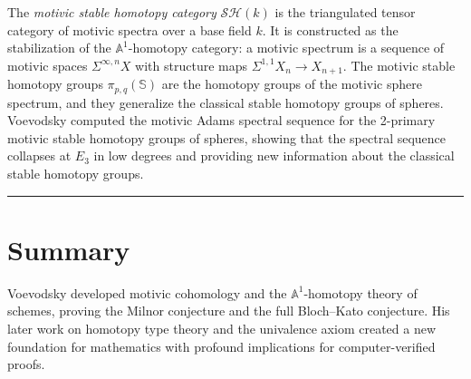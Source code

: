 The \emph{motivic stable homotopy category} $\mathcal{SH}(k)$ is the triangulated tensor category of motivic spectra over a base field $k$. It is constructed as the stabilization of the $\mathbb{A}^1$-homotopy category: a motivic spectrum is a sequence of motivic spaces $\Sigma^{\infty,n} X$ with structure maps $\Sigma^{1,1} X_n \to X_{n+1}$. The motivic stable homotopy groups $\pi_{p,q}(\mathbb{S})$ are the homotopy groups of the motivic sphere spectrum, and they generalize the classical stable homotopy groups of spheres. Voevodsky computed the motivic Adams spectral sequence for the 2-primary motivic stable homotopy groups of spheres, showing that the spectral sequence collapses at $E_3$ in low degrees and providing new information about the classical stable homotopy groups.

\begin{center}\rule{0.5\linewidth}{0.5pt}\end{center}

\section*{Summary}

Voevodsky developed motivic cohomology and the $\mathbb{A}^1$-homotopy theory of schemes, proving the Milnor conjecture and the full Bloch--Kato conjecture. His later work on homotopy type theory and the univalence axiom created a new foundation for mathematics with profound implications for computer-verified proofs.

